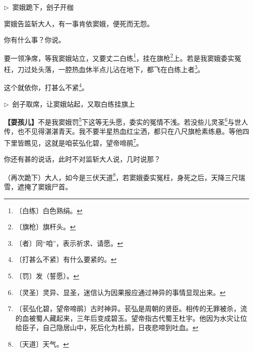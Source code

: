 \documentclass[12pt,UTF-8,openany]{ctexbook}
\renewcommand{\footnotesize}{\fontsize{8.5pt}{10.5pt}\selectfont}
\begin{document}
\begin{normalsize}
\begin{description}[itemsep=1ex,leftmargin=3.5em,labelwidth=3em]
    \end{description}
    
    \noindent $\triangleright$~窦娥跪下，刽子开枷
    
    \begin{description}[itemsep=1ex,leftmargin=3.5em,labelwidth=3em]
    
    \item[{\color{script-5-2} 窦娥}]窦娥告监斩大人，有一事肯依窦娥，便死而无怨。
    
    \item[{\color{script-5-0} 监斩官}]你有什么事？你说。
    
    \item[{\color{script-5-2} 窦娥}]要一领净席，等我窦娥站立，又要丈二白练\footnote{〔白练〕白色熟绢。}，挂在旗枪\footnote{〔旗枪〕旗杆头。}上。若是我窦娥委实冤枉，刀过处头落，一腔热血休半点儿沾在地下，都飞在白练上者\footnote{〔者〕同“咱”，表示祈求、请愿。}。
    
    \item[{\color{script-5-0} 监斩官}]这个就依你，打甚么不紧\footnote{〔打甚么不紧〕有什么要紧的。}。
    
    \end{description}
    
    \noindent $\triangleright$~刽子取席，让窦娥站起，又取白练挂旗上
    
    \begin{description}[itemsep=1ex,leftmargin=3.5em,labelwidth=3em]
    
    \item[{\color{script-5-2} 窦娥}]{\footnotesize\textbf{【耍孩儿】}}不是我窦娥罚\footnote{〔罚〕发（誓愿）。}下这等无头愿，委实的冤情不浅。若没些儿灵圣\footnote{〔灵圣〕灵异、显圣，迷信认为因果报应通过神异的事情显现出来。}与世人传，也不见得湛湛青天。我不要半星热血红尘洒，都只在八尺旗枪素练悬。等他四下里皆瞧见，这就是咱苌弘化碧，望帝啼鹃\footnote{〔苌弘化碧，望帝啼鹃〕古时神异。苌弘是周朝的贤臣。相传的无罪被杀，流的血被蜀人藏起来，三年后变成碧玉。望帝指古代蜀王杜宇。他因为水灾让位给臣子，自己隐居山中，死后化为杜鹃，日夜悲啼到吐血。}。
    
    \item[{\color{script-5-1} 刽子}]你还有甚的说话，此时不对监斩大人说，几时说那？
    
    \item[{\color{script-5-2} 窦娥}]（再次跪下）大人，如今是三伏天道\footnote{〔天道〕天气。}，若窦娥委实冤枉，身死之后，天降三尺瑞雪，遮掩了窦娥尸首。
    

\end{description}
\end{normalsize}
\end{document}
